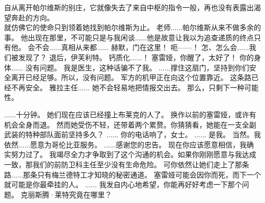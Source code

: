 \documentclass[openany]{book}
\begin{document}
\begin{dialogue}
    自从离开帕尔维斯的别庄，它就像失去了来自中枢的指令一般，再也没有表露出渴望奔赴的方向。\\
    就仿佛它的使命只到领着她找到帕尔维斯为止。
     老师......帕尔维斯从来不做多余的事。
     他出现在那里，不可能只是与我闲谈......他是故意让我以为追查递质的终点只有他。
     会不会......真相从来都......
     赫默，门在这里！
     呃——！
     怎、怎么会......我们被发现了？
     退后，伊芙利特。
     钙质化......！
     塞雷娅，你醒了，太好了！
     你的身体......
     没有问题。
     我是医生，这种话骗不了我。
     ......撑住这扇门，坚持到你们安全离开已经足够。所以，没有问题。
     军方的机甲正在向这个位置靠近。
     这条路已经不再安全。
     雅拉主任......
     她不会轻易地把情报交出去。
     那么，只剩下一种可能性。
\end{dialogue}

\begin{dialogue}
     ......十分钟。
     她们现在应该已经撞上布莱克的人了。
     换作以前的塞雷娅，或许有机会全身而退。
     然而她受伤不轻，还带着两个累赘。你猜猜看，她能在一支全副武装的特种部队面前坚持多久？
     ......
     你的电话响了，女士。
     ......
     是我。
     当然。我依然......愿意为哥伦比亚服务。
     ......感谢您的忠告。
     现在你应该愿意相信，我确实努力过了。
     我竭尽全力才争取到了这个沟通的机会。如果你刚刚愿意与我达成一致，那我们的前防卫科主任至少没有生命危险。
     可你依然让她们走上了那条路......那条只有梅兰德特工才知晓的秘密通道。
     塞雷娅可能会因你而死，而下一个就可能是你最牵挂的人。
     ......
     我发自内心地希望，你能再好好考虑一下那个问题。
     克丽斯腾·莱特究竟在哪里？
\end{dialogue}
\end{document}
